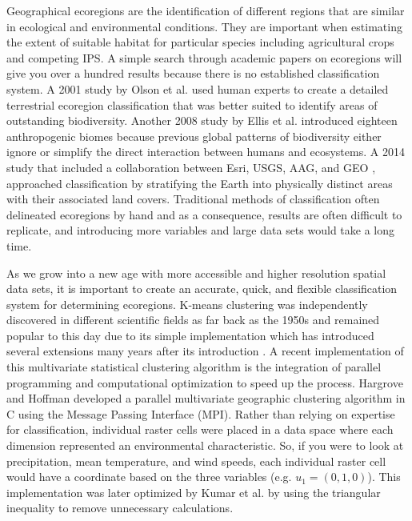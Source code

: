 \documentclass[a4paper,10pt]{article}
\begin{document}
Geographical ecoregions are the identification of different regions that are similar in ecological and environmental 
conditions. They are important when estimating the extent of suitable habitat for particular species including 
agricultural crops and competing IPS. A simple search through academic papers on ecoregions will give you over a 
hundred results because there is no established classification system. A 2001 study by Olson et al. \cite{olson2001terrestrial} 
used human experts to create a detailed terrestrial ecoregion classification that was better suited to identify areas 
of outstanding biodiversity. Another 2008 study by Ellis et al. \cite{ellis2008putting} introduced eighteen 
anthropogenic biomes because previous global patterns of biodiversity either ignore or simplify the direct 
interaction between humans and ecosystems. A 2014 study that included a collaboration between Esri, USGS, AAG, and 
GEO \cite{globaleco2014a}, approached classification by stratifying the Earth into physically distinct areas with 
their associated land covers. Traditional methods of classification often delineated ecoregions by hand and as a 
consequence, results are often difficult to replicate, and introducing more variables and large data sets would 
take a long time.

As we grow into a new age with more accessible and higher resolution spatial data sets, it is important to create 
an accurate, quick, and flexible classification system for determining ecoregions. K-means clustering was 
independently discovered in different scientific fields as far back as the 1950s and remained popular to this 
day due to its simple implementation which has introduced several extensions many years after its introduction 
\cite{cuomo2019a,dunn1973a,jain2010data,pelleg1999accelerating,scholkopf1998nonlinear,tang2017parallel}. 
A recent implementation of this multivariate statistical clustering algorithm is the integration of parallel 
programming and computational optimization to speed up the process. Hargrove and Hoffman \cite{hargrove1999using} 
developed a parallel multivariate geographic clustering algorithm in C using the Message Passing Interface (MPI). 
Rather than relying on expertise for classification, individual raster cells were placed in a data space where 
each dimension represented an environmental characteristic. So, if you were to look at precipitation, mean 
temperature, and wind speeds, each individual raster cell would have a coordinate based on the three variables 
(e.g. $u_{1} = (0, 1, 0)$). This implementation was later optimized by Kumar et al. \cite{kumar2011parallel} by using the 
triangular inequality to remove unnecessary calculations.
\end{document}
